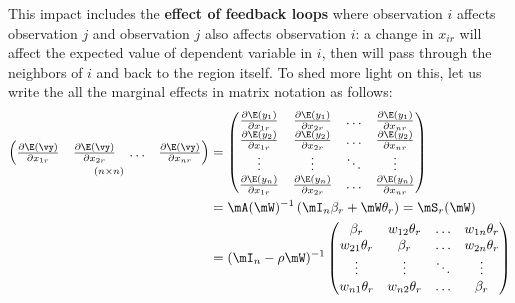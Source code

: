 \documentclass[english,12pt]{book}\usepackage[]{graphicx}\usepackage[]{xcolor}
\begin{document}
This impact includes the \textbf{effect of feedback loops} where observation $i$ affects observation $j$ and observation $j$ also affects observation $i$: a change in $x_{ir}$ will affect the expected value of dependent variable in $i$, then will pass through the neighbors of $i$ and back to the region itself. To shed more light on this, let us write the all the marginal effects in matrix notation as follows:
\begin{equation}\label{eq:matrix_marginal_effects}
\begin{aligned}
 \underset{(n \times n)}{\begin{pmatrix}
  \frac{\partial \E(\vy)}{\partial x_{1r}} & \frac{\partial \E(\vy)}{\partial x_{2r}} & \hdots & \frac{\partial \E(\vy)}{\partial x_{nr}} 
   \end{pmatrix}} & = 
  \begin{pmatrix}
  \frac{\partial \E(y_1)}{\partial x_{1r}} & \frac{\partial \E(y_1)}{\partial x_{2r}} & \hdots & \frac{\partial \E(y_1)}{\partial x_{nr}} \\
  \frac{\partial \E(y_2)}{\partial x_{1r}} & \frac{\partial \E(y_2)}{\partial x_{2r}} & \hdots & \frac{\partial \E(y_2)}{\partial x_{nr}} \\
  \vdots & \vdots & \ddots & \vdots \\
  \frac{\partial \E(y_n)}{\partial x_{1r}} & \frac{\partial \E(y_n)}{\partial x_{2r}} & \hdots & \frac{\partial \E(y_n)}{\partial x_{nr}} 
  \end{pmatrix} \\
  & = \mA(\mW)^{-1}\left(\mI_n\beta_r + \mW\theta_r\right) = \mS_r(\mW) \\
  & = (\mI_n - \rho\mW)^{-1}
  \begin{pmatrix}
    \beta_r  & w_{12} \theta_r  & \hdots & w_{1n}\theta_r \\
    w_{21} \theta_r  & \beta_r   & \hdots & w_{2n}\theta_r \\
    \vdots & \vdots & \ddots & \vdots \\
    w_{n1} \theta_r  & w_{n2} \theta_r  & \hdots  & \beta_r \\
  \end{pmatrix}
\end{aligned}  
\end{equation}
\end{document}
